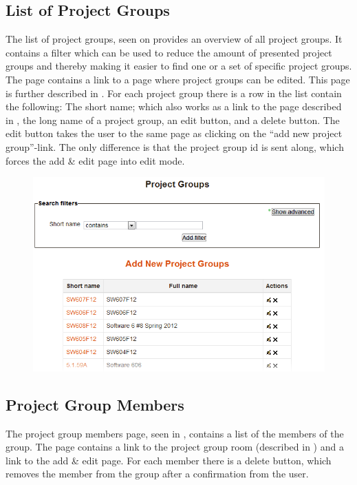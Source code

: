 \subsection{List of Project Groups}
\label{sec:preListPg}
The list of project groups, seen on  provides an overview of all project groups. 
It contains a filter which can be used to reduce the amount of presented project groups and thereby making it easier to find one or a set of specific project groups. 
The page contains a link to a page where project groups can be edited. 
This page is further described in .
For each project group there is a row in the list contain the following: The short name; which also works as a link to the page described in , the long name of a project group, an edit button, and a delete button. 
The edit button takes the user to the same page as clicking on the ``add new project group''-link. 
The only difference is that the project group id is sent along, which forces the add \& edit page into edit mode. 

\begin{figure}
	\centering
		\includegraphics[width=\textwidth]{images/moodleadminprojectgrouplist.png}

		\label{fig:moodleadouplist}
\end{figure}


\FloatBarrier

\subsection{Project Group Members}
\label{sec:projectGrpMem}
The project group members page, seen in , contains a list of the members of the group. 
The page contains a link to the project group room (described in ) and a link to the add \& edit page. 
For each member there is a delete button, which removes the member from the group after a confirmation from the user.

